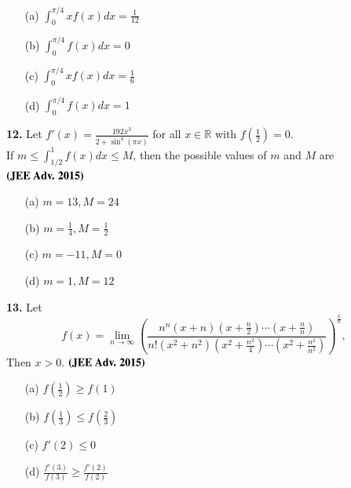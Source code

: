\documentclass[journal,12pt,twocolumn]{IEEEtran}
\theoremstyle{remark}
\begin{document}
    \begin{multicols}{2}
    \begin{enumerate}
    \item  [(a)] $\int_0^{\pi/4} x f(x) dx = \frac{1}{12}$ \item [(b)]$\int_0^{\pi/4} f(x) dx = 0$
    \columnbreak
    \item  [(c)] $\int_0^{\pi/4} x f(x) dx = \frac{1}{6}$
    \item  [(d)] $\int_0^{\pi/4} f(x) dx = 1$ \end{enumerate}
    \end{multicols}

     

     \noindent\textbf{12.} Let $f'(x) = \frac{192x^3}{2 + \sin^4(\pi x)}$ for all $x \in \mathbb{R}$ with $f\left(\frac{1}{2}\right) = 0$.\\
     If $m \leq \int_{1/2}^{1} f(x) dx \leq M$, then the possible values of $m$ and $M$ are $\hfill \textbf{(JEE Adv. 2015)}$
     \begin{multicols}{2}
     \begin{enumerate}
             \item[(a)] $m = 13, M = 24$
	         \item[(b)] $m = \frac{1}{4}, M = \frac{1}{2}$
		     \columnbreak
		         \item[(c)] $m = -11, M = 0$
			     \item[(d)] $m = 1, M = 12$
			     \end{enumerate}
			     \end{multicols}  
			     \textbf{13.} Let
			     \[
			     f(x) = \lim_{n \to \infty} \left( \frac{n^n (x+n) \left(x + \frac{n}{2}\right) \cdots \left(x + \frac{n}{n}\right)}{n! \left(x^2 + n^2\right) \left(x^2 + \frac{n^2}{4}\right) \cdots \left(x^2 + \frac{n^2}{n^2}\right)} \right)^{\frac{x}{n}},
			     \]
			     Then   $x > 0$. $\hfill \textbf{(JEE Adv. 2015)}$
			     \begin{multicols}{2}
			     \begin{enumerate}
			         \item[(a)] $f\left(\frac{1}{2}\right) \geq f(1)$
				     \item[(b)] $f\left(\frac{1}{3}\right) \leq f\left(\frac{2}{3}\right)$
				         \item[(c)] $f'(2) \leq 0$
					     \item[(d)] $\frac{f'(3)}{f(3)} \geq \frac{f'(2)}{f(2)}$
					     \end{enumerate}
					     \end{multicols}
\end{document}
